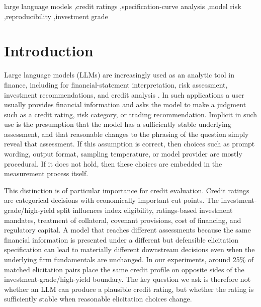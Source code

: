 \documentclass[a4paper,fleqn]{cas-sc}
\begin{document}
\begin{keywords}
large language models \sep credit ratings \sep specification-curve analysis \sep model risk \sep reproducibility \sep investment grade
\end{keywords}

\maketitle

\section{Introduction}
Large language models (LLMs) are increasingly used as an analytic tool in finance, including for
financial-statement interpretation, risk assessment, investment recommendations, and credit analysis
\citep{hens2025risk}. In such applications a user usually provides financial information and asks
the model to make a judgment such as a credit rating, risk category, or trading recommendation. Implicit
in such use is the presumption that the model has a sufficiently stable underlying assessment, and that
reasonable changes to the phrasing of the question simply reveal that assessment. If this assumption is
correct, then choices such as prompt wording, output format, sampling temperature, or model provider are
mostly procedural. If it does not hold, then these choices are embedded in the measurement process
itself.

This distinction is of particular importance for credit evaluation. Credit ratings are categorical
decisions with economically important cut points. The investment-grade/high-yield split influences index
eligibility, ratings-based investment mandates, treatment of collateral, covenant provisions, cost of
financing, and regulatory capital. A model that reaches different assessments because the same financial
information is presented under a different but defensible elicitation specification can lead to materially
different downstream decisions even when the underlying firm fundamentals are unchanged. In our
experiments, around 25\% of matched elicitation pairs place the same credit profile on opposite sides of
the investment-grade/high-yield boundary. The key question we ask is therefore not whether an LLM can
produce a plausible credit rating, but whether the rating is sufficiently stable when reasonable
elicitation choices change.
\end{document}
